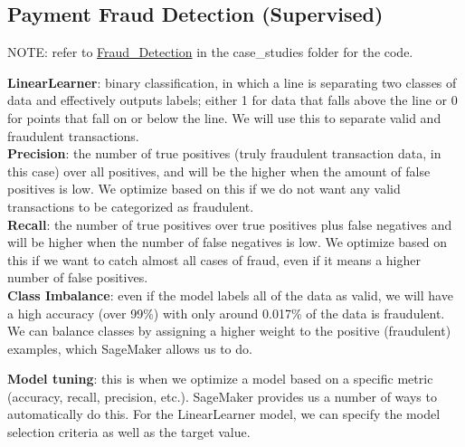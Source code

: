 \documentclass[11pt, a4paper]{article}
\begin{document}
\begin{spacing}{1.1}
	\subsection{Payment Fraud Detection (Supervised)}
	\begin{center}
	\color{darkgray} NOTE: refer to \href{file:///E:/Documents/UdacityNotes/ML\%20Engineer/sample_code/case_studies/Fraud_Detection.html}{Fraud\_Detection} in the case\_studies folder for the code. \color{black}
	\end{center}
	\textbf{LinearLearner}: binary classification, in which a line is separating two classes of data and effectively outputs labels; either 1 for data that falls above the line or 0 for points that fall on or below the line. We will use this to separate valid and fraudulent transactions. \vspace*{2mm}\\
	\textbf{Precision}: the number of true positives (truly fraudulent transaction data, in this case) over all positives, and will be the higher when the amount of false positives is low. We optimize based on this if we do not want any valid transactions to be categorized as fraudulent.\vspace*{2mm}\\
	\textbf{Recall}: the number of true positives over true positives plus false negatives and will be higher when the number of false negatives is low. We optimize based on this if we want to catch almost all cases of fraud, even if it means a higher number of false positives.\vspace*{2mm}\\
	\textbf{Class Imbalance}: even if the model labels all of the data as valid, we will have a high accuracy (over 99\%) with only around 0.017\% of the data is fraudulent. We can balance classes by assigning a higher weight to the positive (fraudulent) examples, which SageMaker allows us to do. \newpage

	\noindent \textbf{Model tuning}: this is when we optimize a model based on a specific metric (accuracy, recall, precision, etc.). SageMaker provides us a number of ways to automatically do this. For the LinearLearner model, we can specify the model selection criteria as well as the target value. \vspace*{2mm}
	

\end{spacing}
\end{document}
